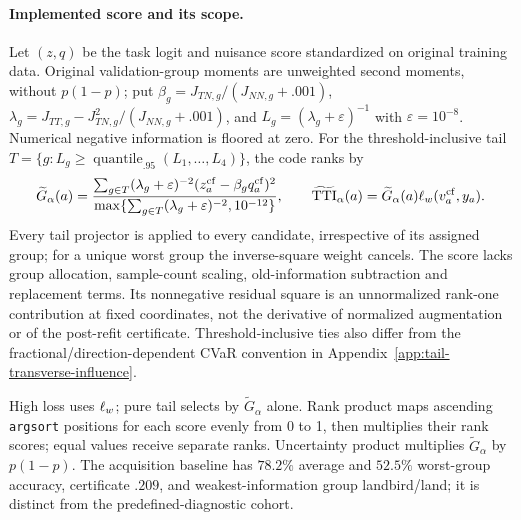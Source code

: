 \paragraph{Implemented score and its scope.}
Let $(z,q)$ be the task logit and nuisance score standardized on original training data. Original validation-group moments are unweighted second moments, without $p(1-p)$; put $\beta_g=J_{TN,g}/(J_{NN,g}+.001)$, $\lambda_g=J_{TT,g}-J_{TN,g}^2/(J_{NN,g}+.001)$, and $L_g=(\lambda_g+\varepsilon)^{-1}$ with $\varepsilon=10^{-8}$. Numerical negative information is floored at zero. For the threshold-inclusive tail $T=\{g:L_g\ge\operatorname{quantile}_{.95}(L_1,\ldots,L_4)\}$, the code ranks by
\begin{equation}
\widetilde G_\alpha(a)=
\frac{\sum_{g\in T}(\lambda_g+\varepsilon)^{-2}(z_a^{\mathrm{cf}}-\beta_gq_a^{\mathrm{cf}})^2}
{\max\{\sum_{g\in T}(\lambda_g+\varepsilon)^{-2},10^{-12}\}},
\qquad
\widetilde{\mathrm{TTI}}_\alpha(a)=\widetilde G_\alpha(a)\ell_w(v_a^{\mathrm{cf}},y_a).
\label{eq:implemented-acquisition-score}
\end{equation}
Every tail projector is applied to every candidate, irrespective of its assigned group; for a unique worst group the inverse-square weight cancels. The score lacks group allocation, sample-count scaling, old-information subtraction and replacement terms. Its nonnegative residual square is an unnormalized rank-one contribution at fixed coordinates, not the derivative of normalized augmentation or of the post-refit certificate. Threshold-inclusive ties also differ from the fractional/direction-dependent CVaR convention in Appendix~\ref{app:tail-transverse-influence}.

High loss uses $\ell_w$; pure tail selects by $\widetilde G_\alpha$ alone. Rank product maps ascending \texttt{argsort} positions for each score evenly from 0 to 1, then multiplies their rank scores; equal values receive separate ranks. Uncertainty product multiplies $\widetilde G_\alpha$ by $p(1-p)$. The acquisition baseline has $78.2\%$ average and $52.5\%$ worst-group accuracy, certificate $.209$, and weakest-information group landbird/land; it is distinct from the predefined-diagnostic cohort.

